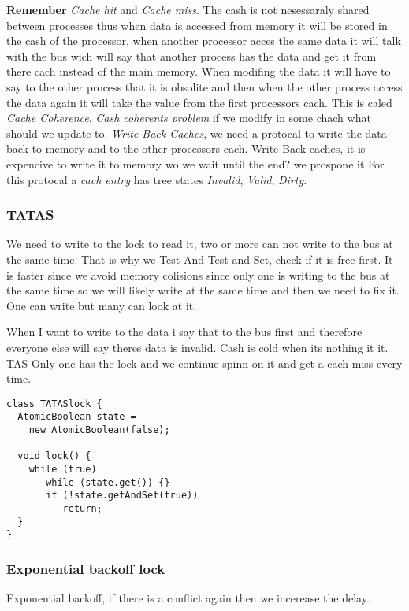\textbf{Remember} \textit{Cache hit} and \textit{Cache miss}.
The cash is not nesessaraly shared between processes thus when data
is accessed from memory it will be stored in the cash of the processor,
when another processor acces the same data it will talk with the bus wich
will say that another process has the data and get it from there cach instead of
the main memory. When modifing the data it will have to say to the other process
that it is obsolite and then when the other process access the data again it will
take the value from the first processors cach.
This is caled \textit{Cache Coherence}.
\textit{Cash coherents problem} if we modify in some chach what should we update to.
\textit{Write-Back Caches}, we need a protocal
to write the data back to memory and to the other processors cach.
Write-Back caches, it is expencive to write it to memory wo we wait until the end? we prospone it
For this protocal a \textit{cach entry} has tree states \textit{Invalid}, \textit{Valid}, \textit{Dirty}.


\subsubsection{TATAS}
We need to write to the lock to read it, two or more can not write to the bus at the same time.
That is why we Test-And-Test-and-Set, check if it is free first. 
It is faster since we avoid memory colisions since only one is writing to the bus at the same time so we will likely write at the same time and then we need to fix it. One can write but many can look at it.

When I want to write to the data i say that to the bus first and therefore everyone else will say theres
data is invalid. Cash is cold when its nothing it it.
TAS Only one has the lock and we continue spinn on it and get a cach miss every time.

\begin{BVerbatim}[baseline=c]
class TATASlock {
  AtomicBoolean state =
    new AtomicBoolean(false);

  void lock() {
    while (true)
       while (state.get()) {}
       if (!state.getAndSet(true))
          return;
  }
}
\end{BVerbatim}


\subsubsection{Exponential backoff lock}
Exponential backoff, if there is a conflict again then we incerease the delay.

